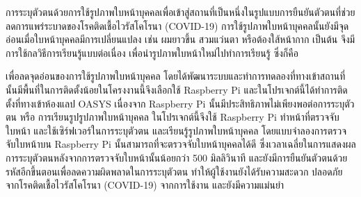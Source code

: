 \maketitle
\makesignature

\ifproject
\begin{abstractTH}


การระบุตัวตนด้วยการใช้รูปภาพใบหน้าบุคคลเพื่อเข้าสู่สถานที่เป็นหนึ่งในรูปแบบการยืนยันตัวตนที่ช่วยลดการแพร่ระบาดของโรคติดเชื้อไวรัสโคโรนา (COVID-19)
การใช้รูปภาพใบหน้าบุคคลนั้นยังมีจุดอ่อนเมื่อใบหน้าบุคคลมีการเปลี่ยนแปลง เช่น ผมยาวขึ้น สวมแว่นตา หรือต้องใส้หน้ากาก เป็นต้น จึงมีการใช้กลวิธีการเรียนรู้แบบต่อเนื่อง เพื่อนำรูปภาพใบหน้าใหม่ไปทำการเรียนรู้ 
ซึ่งก็คือ 

เพื่อลดจุดอ่อนของการใช้รูปภาพใบหน้าบุคคล โดยได้พัฒนาระบบและทำการทดลองที่ทางเข้าสถานที่นั้นมีพื้นที่ในการติดตั้งน้อยในโครงงานนี้จึงเลือกใช้ Raspberry Pi และในโปรเจกต์นี้ได้ทำการติดตั้งที่ทางเข้าห้องแลป OASYS 
เนื่องจาก Raspberry Pi นั้นมีประสิทธิภาพไม่เพียงพอต่อการระบุตัวตน หรือ การเรียนรูปรูปภาพใบหน้าบุคคล ในโปรเจกต์นี้จึงใช้ Raspberry Pi ทำหน้าที่ตรวจจับใบหน้า และใช้เซิร์ฟเวอร์ในการระบุตัวตน 
และเรียนรู้รูปภาพใบหน้าบุคคล โดยแบบจำลองการตรวจจับใบหน้าบน Raspberry Pi นั้นสามารถที่จะตรวจจับใบหน้าบุคคลได้ดี ซึ่งเวลาเฉลี่ยในการแสดงผลการระบุตัวตนหลังจากการตรวจจับใบหน้านั้นน้อยกว่า 500 มิลลิวินาที 
และยังมีการยืนยันตัวตนด้วยรหัสอีกขึ้นตอนเพื่อลดความผิดพลาดในการระบุตัวตน ทำให้ผู้ใช้งานยังได้รับความสะดวก ปลอดภัยจากโรคติดเชื้อไวรัสโคโรนา (COVID-19) จากการใช้งาน และยังมีความแม่นยำ

\end{abstractTH}

